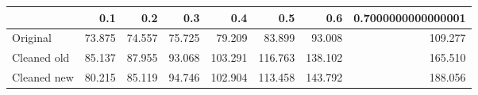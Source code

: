 \begin{tabular}{lrrrrrrr}
\toprule
{} &    0.1 &    0.2 &    0.3 &     0.4 &     0.5 &     0.6 & 0.7000000000000001 \\
\midrule
Original    & 73.875 & 74.557 & 75.725 &  79.209 &  83.899 &  93.008 &            109.277 \\
Cleaned old & 85.137 & 87.955 & 93.068 & 103.291 & 116.763 & 138.102 &            165.510 \\
Cleaned new & 80.215 & 85.119 & 94.746 & 102.904 & 113.458 & 143.792 &            188.056 \\
\bottomrule
\end{tabular}
